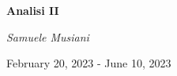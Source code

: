 \thispagestyle{empty}

\begin{center}
	\vfill
    \vspace*{0.3\textheight}

	\Huge
	\textbf{Analisi II}
	
	\vspace{1cm}
	
	\Large
	\textit{Samuele Musiani}
	
	\vspace{3cm}
	
	\large
	February 20, 2023 - June 10, 2023
	
    \normalsize
    
\end{center}
